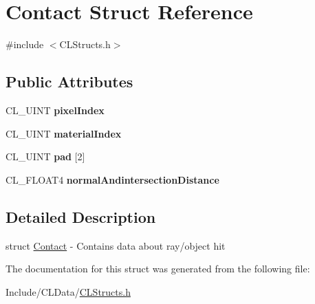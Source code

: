 \hypertarget{struct_contact}{}\section{Contact Struct Reference}
\label{struct_contact}


{\ttfamily \#include $<$C\+L\+Structs.\+h$>$}

\subsection*{Public Attributes}
\begin{DoxyCompactItemize}
\item 
C\+L\+\_\+\+U\+I\+NT {\bfseries pixel\+Index}\hypertarget{struct_contact_adba5ee574753821840cfead3a1676221}{}\label{struct_contact_adba5ee574753821840cfead3a1676221}

\item 
C\+L\+\_\+\+U\+I\+NT {\bfseries material\+Index}\hypertarget{struct_contact_ae85e41cc90cd2fc094f96ef819903958}{}\label{struct_contact_ae85e41cc90cd2fc094f96ef819903958}

\item 
C\+L\+\_\+\+U\+I\+NT {\bfseries pad} \mbox{[}2\mbox{]}\hypertarget{struct_contact_a4b7796bb30a27ab70fe8c8d260b0e947}{}\label{struct_contact_a4b7796bb30a27ab70fe8c8d260b0e947}

\item 
C\+L\+\_\+\+F\+L\+O\+A\+T4 {\bfseries normal\+Andintersection\+Distance}\hypertarget{struct_contact_aad6c018e0e4777e79ba28c98a7493372}{}\label{struct_contact_aad6c018e0e4777e79ba28c98a7493372}

\end{DoxyCompactItemize}


\subsection{Detailed Description}
struct \hyperlink{struct_contact}{Contact} -\/ Contains data about ray/object hit 

The documentation for this struct was generated from the following file\+:\begin{DoxyCompactItemize}
\item 
Include/\+C\+L\+Data/\hyperlink{_c_l_structs_8h}{C\+L\+Structs.\+h}\end{DoxyCompactItemize}
